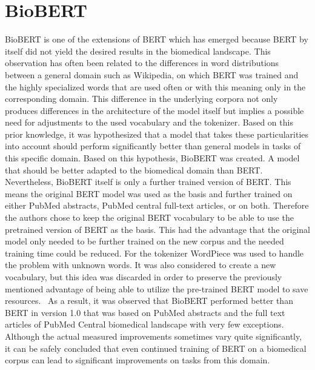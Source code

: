 \section{BioBERT}
BioBERT is one of the extensions of BERT which has emerged because BERT by itself did not yield the desired results in the biomedical landscape. This observation has often been related to the differences in word distributions between a general domain such as Wikipedia, on which BERT was trained and the highly specialized words that are used often or with this meaning only in the corresponding domain. This difference in the underlying corpora not only produces differences in the architecture of the model itself but implies a possible need for adjustments to the used vocabulary and the tokenizer. \cite{Lee2019} 
\newline
Based on this prior knowledge, it was hypothesized that a model that takes these particularities into account should perform significantly better than general models in tasks of this specific domain. Based on this hypothesis, BioBERT was created. A model that should be better adapted to the biomedical domain than BERT.
\newline
Nevertheless, BioBERT itself is only a further trained version of BERT. This means the original BERT model was used as the basis and further trained on either PubMed abstracts, PubMed central full-text articles, or on both. Therefore the authors chose to keep the original BERT vocabulary to be able to use the pretrained version of BERT as the basis. This had the advantage that the original model only needed to be further trained on the new corpus and the needed training time could be reduced. For the tokenizer WordPiece was used to handle the problem with unknown words. It was also considered to create a new vocabulary, but this idea was discarded in order to preserve the previously mentioned advantage of being able to utilize the pre-trained BERT model to save resources. 
As a result, it was observed that BioBERT performed better than BERT in version 1.0 that was based on PubMed abstracts and the full text articles of PubMed Central biomedical landscape with very few exceptions. Although the actual measured improvements sometimes vary quite significantly, it can be safely concluded that even continued training of BERT on a biomedical corpus can lead to significant improvements on tasks from this domain. 


